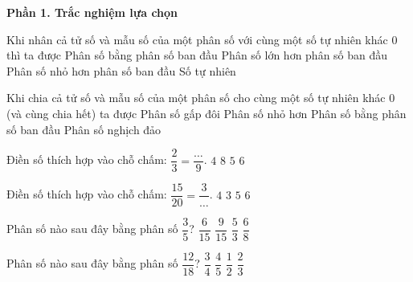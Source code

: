 \textbf{Phần 1. Trắc nghiệm lựa chọn}

\begin{ex} %
Khi nhân cả tử số và mẫu số của một phân số với cùng một số tự nhiên khác 0 thì ta được
\choice
{\True Phân số bằng phân số ban đầu}
{Phân số lớn hơn phân số ban đầu}
{Phân số nhỏ hơn phân số ban đầu}
{Số tự nhiên}
\end{ex}

\begin{ex} %
Khi chia cả tử số và mẫu số của một phân số cho cùng một số tự nhiên khác 0 (và cùng chia hết) ta được
\choice
{Phân số gấp đôi}
{Phân số nhỏ hơn}
{\True Phân số bằng phân số ban đầu}
{Phân số nghịch đảo}
\end{ex}

\begin{ex} %
Điền số thích hợp vào chỗ chấm: $\dfrac{2}{3} = \dfrac{\dots}{9}$.
\choice
{$4$}
{$8$}
{$5$}
{\True $6$}
\end{ex}

\begin{ex} %
Điền số thích hợp vào chỗ chấm: $\dfrac{15}{20} = \dfrac{3}{\dots}$.
\choice
{\True $4$}
{$3$}
{$5$}
{$6$}
\end{ex}

\begin{ex} %
Phân số nào sau đây bằng phân số $\dfrac{3}{5}$?
\choice
{$\dfrac{6}{15}$}
{\True $\dfrac{9}{15}$}
{$\dfrac{5}{3}$}
{$\dfrac{6}{8}$}
\end{ex}

\begin{ex} %
Phân số nào sau đây bằng phân số $\dfrac{12}{18}$?
\choice
{$\dfrac{3}{4}$}
{$\dfrac{4}{5}$}
{$\dfrac{1}{2}$}
{\True $\dfrac{2}{3}$}
\end{ex}

